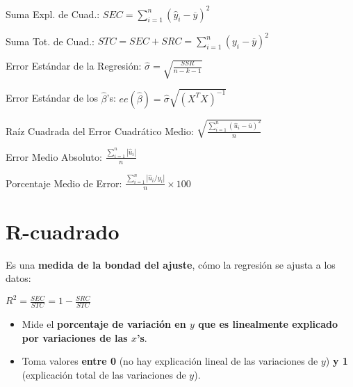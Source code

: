 \documentclass[10pt, a4paper, landscape]{extarticle}
\begin{document}
\begin{multicols}{3}
\vspace*{0.5mm}

Suma Expl. de Cuad.: \hfill $SEC = \sum_{i=1}^n (\hat{y}_i - \overline{y})^2$

\vspace*{0.5mm}

Suma Tot. de Cuad.: \hfill $STC = SEC + SRC = \sum_{i=1}^n (y_i - \overline{y})^2$

\vspace*{0.5mm}

Error Estándar de la Regresión: \hfill $\hat{\sigma} = \sqrt{\frac{SSR}{n-k-1}}$

\vspace*{0.5mm}

Error Estándar de los $\hat{\beta}$'s: \hfill $ee(\hat{\beta}) = \hat{\sigma} \sqrt{(X^T X)^{-1}}$

\vspace*{0.5mm}

Raíz Cuadrada del Error Cuadrático Medio: \hfill $\sqrt{\frac{\sum_{i=1}^n (\hat{u}_i - \overline{u})^2}{n}}$

\vspace*{0.5mm}

Error Medio Absoluto: \hfill $\frac{\sum_{i=1}^n |\hat{u}_i|}{n}$

\vspace*{0.5mm}

Porcentaje Medio de Error: \hfill $\frac{\sum_{i=1}^n |\hat{u}_i / y_i|}{n} \times 100$

\columnbreak

\section*{R-cuadrado}

Es una \textbf{medida de la bondad del ajuste}, cómo la regresión se ajusta a los datos:

\begin{center}
$R^2 = \frac{SEC}{STC} = 1 - \frac{SRC}{STC}$
\end{center}

\begin{itemize}[leftmargin=*]
\item Mide el \textbf{porcentaje de variación en $y$ que es linealmente explicado por variaciones de las $x$'s}.
\item Toma valores \textbf{entre 0} (no hay explicación lineal de las variaciones de $y$) \textbf{y 1} (explicación total de las variaciones de $y$).
\end{itemize}


\end{multicols}
\end{document}
